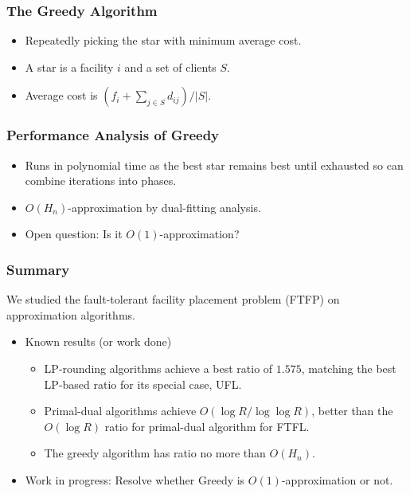 \documentclass[handout, hyperref, xcolor=dvipsnames]{beamer}
\begin{document}
\begin{frame}
  \frametitle{The Greedy Algorithm}
  \begin{itemize}
  \item Repeatedly picking the star with minimum average cost.
  \item A star is a facility $i$ and a set of clients $S$.
  \item Average cost is $ (f_i + \sum_{j\in S} d_{ij}) / |S|$.
  \end{itemize}
\end{frame}

\begin{frame}
  \frametitle{Performance Analysis of Greedy}
  \begin{itemize}
  \item Runs in polynomial time as the best star remains best until
    exhausted so can combine iterations into phases.
  \item $O(H_n)$-approximation by dual-fitting analysis.
  \item Open question: Is it $O(1)$-approximation?
  \end{itemize}
\end{frame}

\begin{frame}
  \frametitle{Summary} We studied the fault-tolerant facility
  placement problem (FTFP) on approximation algorithms.

  \begin{itemize}
  \item Known results (or work done)
    \begin{itemize}
    \item LP-rounding algorithms achieve a best ratio of $1.575$,
      matching the best LP-based ratio for its special case, UFL.
    \item Primal-dual algorithms achieve $O(\log R/\log\log R)$,
      better than the $O(\log R)$ ratio for primal-dual algorithm for
      FTFL.
    \item The greedy algorithm has ratio no more than $O(H_n)$.
  \end{itemize}
  \item Work in progress:
    Resolve whether Greedy is $O(1)$-approximation or not.
  \end{itemize}
\end{frame}
\end{document}
